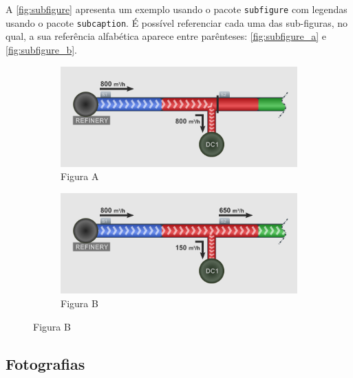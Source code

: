 A \autoref{fig:subfigure} apresenta um exemplo usando o pacote \texttt{subfigure} com legendas usando o pacote \texttt{subcaption}. É  possível referenciar cada uma das sub-figuras, no qual, a sua referência alfabética aparece entre parênteses: \autoref{fig:subfigure_a} e \autoref{fig:subfigure_b}.

\begin{figure}[!ht]
\centering
\caption{Exemplo de Subfigure} 
\begin{subfigure}[t]{.45\textwidth}
	\centering
	\includegraphics[width=\textwidth]{./CapituloExemplo/subfigure-a.png}  
	\caption{Figura A}
	\label{fig:subfigure_a}
\end{subfigure}
\qquad
\begin{subfigure}[t]{.45\textwidth}
	\centering
	\includegraphics[width=\textwidth]{./CapituloExemplo/subfigure-b.png}  
	\caption{Figura B}
	\label{fig:subfigure_b}
\end{subfigure}
\label{fig:subfigure}
\end{figure}

\subsection{Fotografias}\label{sec:fotografias}

